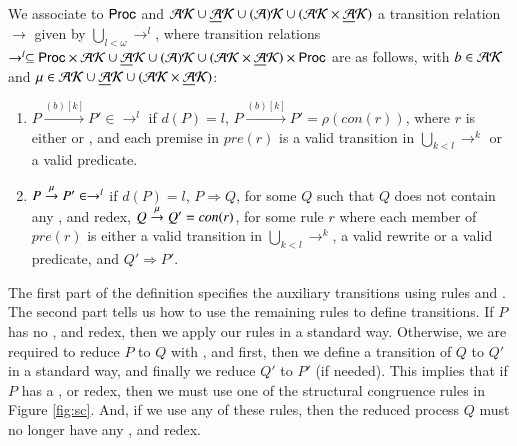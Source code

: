 \begin{definition}\label{LTS} \normalfont
We associate to $\mathsf{Proc}$ and $\mathcal{AK} \cup \underline{\mathcal{A}}\mathcal{K} \cup \mathcal{(A)K} \cup (\mathcal{AK} \times \underline{\mathcal{A}}\mathcal{K})$
a transition relation
$\rightarrow$ given by $ \bigcup_{l<\omega} \rightarrow^l$, where transition relations
$\rightarrow^l \subseteq \mathsf{Proc} \times \mathcal{AK} \cup \underline{\mathcal{A}}\mathcal{K} \cup \mathcal{(A)K} \cup (\mathcal{AK} \times \underline{\mathcal{A}}\mathcal{K}) \times \mathsf{Proc}$
are as follows, with $b\in \mathcal{AK}$ and $\mu \in \mathcal{AK} \cup \underline{\mathcal{A}}\mathcal{K} \cup (\mathcal{AK} \times \underline{\mathcal{A}}\mathcal{K})$:

\begin{enumerate}
\item
$P \xrightarrow{(b)[k]} P' \in \rightarrow^l$ if $d(P)=l$,
$P \xrightarrow{(b)[k]} P'= \rho(con(r))$, where $r$ is either  or ,
and each premise in $pre(r)$ is a valid transition in $\bigcup_{k<l} \rightarrow^k$ or a valid predicate.

\item $P \stackrel{\mu}{\rightarrow} P'\in \rightarrow^l$ if $d(P)=l$, $P\Rightarrow Q$, for some $Q$ such that $Q$
does not contain any ,  and  redex,  $Q \stackrel{\mu}{\rightarrow} Q'= con(r)$,
for some rule $r$ where each member of $pre(r)$ is either a valid transition
in $ \bigcup_{k<l} \rightarrow^k$, a valid rewrite or a valid predicate, and $Q'\Rightarrow P'$.

\end{enumerate}

\end{definition}


The first part of the definition specifies the auxiliary transitions using rules  and 
. The second
part tells us how to use the remaining rules to define transitions. If $P$ has no , 
 and  redex, then we apply our rules in a standard way. Otherwise, we are 
required to reduce $P$ to $Q$ with ,  and  first, 
then we define a transition of $Q$ to $Q'$
in a standard way, and finally we reduce $Q'$ to $P'$ (if needed). This implies that 
if $P$ has a ,  or  redex, then we must use one 
of the structural congruence rules in Figure \ref{fig:sc}. 
And, if we use any of these rules, then the reduced process $Q$ must no longer have any 
,  and  redex. 


